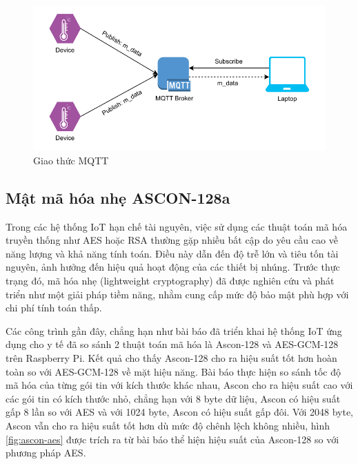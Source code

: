 \begin{figure}[h]
    \centering
    \includegraphics[width=0.85\linewidth]{mqtt.pdf}
    \caption{Giao thức MQTT}
    \label{fig:mqtt}
\end{figure}

\subsection{Mật mã hóa nhẹ ASCON-128a}
Trong các hệ thống IoT hạn chế tài nguyên, việc sử dụng các thuật toán mã hóa truyền thống như AES hoặc RSA thường gặp nhiều bất cập do yêu cầu cao về năng lượng và khả năng tính toán. Điều này dẫn đến độ trễ lớn và tiêu tốn tài nguyên, ảnh hưởng đến hiệu quả hoạt động của các thiết bị nhúng. Trước thực trạng đó, mã hóa nhẹ (lightweight cryptography) đã được nghiên cứu và phát triển như một giải pháp tiềm năng, nhằm cung cấp mức độ bảo mật phù hợp với chi phí tính toán thấp.


Các công trình gần đây, chẳng hạn như bài báo \cite{AESvsAscon} đã triển khai hệ thống IoT ứng dụng cho y tế đã so sánh 2 thuật toán mã hóa là Ascon-128 và AES-GCM-128 trên Raspberry Pi. Kết quả cho thấy Ascon-128 cho ra hiệu suất tốt hơn hoàn toàn so với AES-GCM-128 về mặt hiệu năng. Bài báo thực hiện so sánh tốc độ mã hóa của từng gói tin với kích thước khác nhau, Ascon cho ra hiệu suất cao với các gói tin có kích thước nhỏ, chẳng hạn với 8 byte dữ liệu, Ascon có hiệu suất gấp 8 lần so với AES và với 1024 byte, Ascon có hiệu suất gấp đôi. Với 2048 byte, Ascon vẫn cho ra hiệu suất tốt hơn dù mức độ chênh lệch không nhiều, hình \ref{fig:ascon-aes} được trích ra từ bài báo thể hiện hiệu suất của Ascon-128 so với phương pháp AES.

